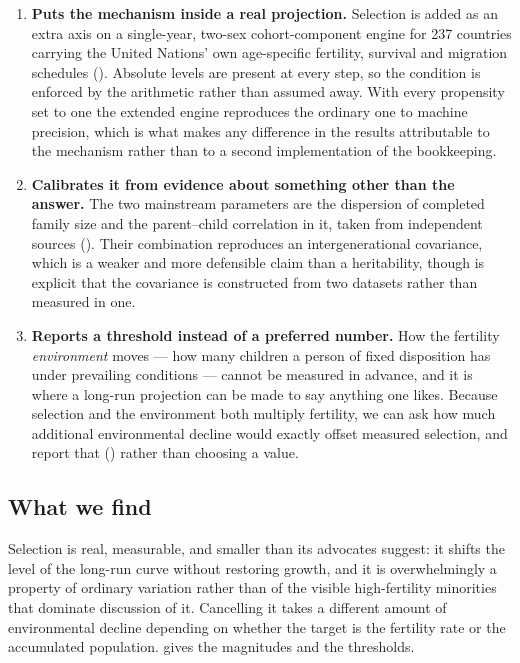 \begin{enumerate}[label=\arabic*., leftmargin=1.6em]
  \item \textbf{Puts the mechanism inside a real projection.} Selection is added
  as an extra axis on a single-year, two-sex cohort-component engine for 237
  countries carrying the United Nations' own age-specific fertility, survival and
  migration schedules (). Absolute levels are present at every
  step, so the \citet{arenberg2022} condition is enforced by the arithmetic
  rather than assumed away. With every propensity set to one the extended engine
  reproduces the ordinary one to machine precision, which is what makes any
  difference in the results attributable to the mechanism rather than to a
  second implementation of the bookkeeping.

  \item \textbf{Calibrates it from evidence about something other than the
  answer.} The two mainstream parameters are the dispersion of completed family
  size and the parent--child correlation in it, taken from independent sources
  (). Their combination reproduces an intergenerational
  covariance, which is a weaker and more defensible claim than a heritability,
  though  is explicit that the covariance is constructed from
  two datasets rather than measured in one.

  \item \textbf{Reports a threshold instead of a preferred number.} How the
  fertility \emph{environment} moves --- how many children a person of fixed
  disposition has under prevailing conditions --- cannot be measured in advance,
  and it is where a long-run projection can be made to say anything one likes.
  Because selection and the environment both multiply fertility, we can ask how
  much additional environmental decline would exactly offset measured selection,
  and report that () rather than choosing a value.
\end{enumerate}

\subsection{What we find}
\label{sec:findings-preview}

Selection is real, measurable, and smaller than its advocates suggest: it shifts
the level of the long-run curve without restoring growth, and it is
overwhelmingly a property of ordinary variation rather than of the visible
high-fertility minorities that dominate discussion of it. Cancelling it takes a
different amount of environmental decline depending on whether the target is the
fertility rate or the accumulated population.  gives the
magnitudes and  the thresholds.
